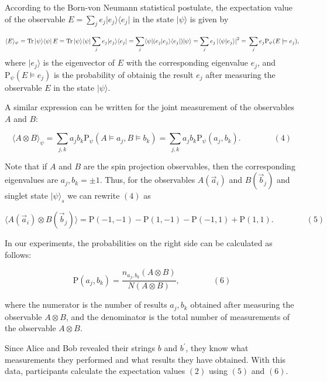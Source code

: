 \documentclass[11pt]{article}
\begin{document}
According to the Born-von Neumann statistical postulate, the expectation
value of the observable
\(E = \sum_j e_j \lvert e_j \rangle \langle e_j \rvert\) in the state
\(\lvert \psi \rangle\) is given by

\[\langle E \rangle_\psi =
  \mathrm{Tr}\, \lvert\psi\rangle \langle\psi\rvert \, E = \\
  \mathrm{Tr}\, \lvert\psi\rangle \langle\psi\rvert \sum_j e_j \lvert e_j \rangle \langle e_j \rvert  = 
  \sum_j \langle\psi\rvert(e_j \lvert e_j \rangle \langle e_j \rvert) \lvert\psi\rangle = 
  \sum_j e_j \left|\langle\psi\lvert e_j \rangle \right|^2 = \\
  \sum_j e_j \mathrm{P}_\psi (E \models e_j),\] where
\(\lvert e_j \rangle\) is the eigenvector of \(E\) with the
corresponding eigenvalue \(e_j\), and
\(\mathrm{P}_\psi (E \models e_j)\) is the probability of obtainig the
result \(e_j\) after measuring the observable \(E\) in the state
\(\lvert \psi \rangle\).

A similar expression can be written for the joint measurement of the
observables \(A\) and \(B\):

\[\langle A \otimes B \rangle_\psi =
  \sum_{j,k} a_j b_k \mathrm{P}_\psi (A \models a_j, B \models b_k) =
  \sum_{j,k} a_j b_k \mathrm{P}_\psi (a_j, b_k). \qquad\qquad (4)\]

Note that if \(A\) and \(B\) are the spin projection observables, then
the corresponding eigenvalues are \(a_j, b_k = \pm 1\). Thus, for the
observables \(A(\vec{a}_i)\) and \(B(\vec{b}_j)\) and singlet state
\(\lvert\psi\rangle_s\) we can rewrite \((4)\) as

\[\langle A(\vec{a}_i) \otimes B(\vec{b}_j) \rangle =
  \mathrm{P}(-1,-1) - \mathrm{P}(1,-1) - \mathrm{P}(-1,1) + \mathrm{P}(1,1). \qquad\qquad (5)\]

In our experiments, the probabilities on the right side can be
calculated as follows:

\[\mathrm{P}(a_j, b_k) = \frac{n_{a_j, b_k}(A \otimes B)}{N(A \otimes B)}, \qquad\qquad (6)\]

where the numerator is the number of results \(a_j, b_k\) obtained after
measuring the observable \(A \otimes B\), and the denominator is the
total number of measurements of the observable \(A \otimes B\).

Since Alice and Bob revealed their strings \(b\) and \(b^{'}\), they
know what measurements they performed and what results they have
obtained. With this data, participants calculate the expectation values
\((2)\) using \((5)\) and \((6)\).
\end{document}

